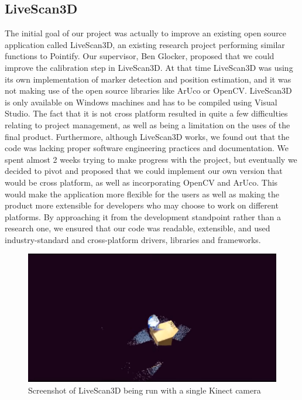 \documentclass{article}
\begin{document}
\subsection{LiveScan3D}
The initial goal of our project was actually to improve an existing open source application called LiveScan3D, an existing research project performing similar functions to Pointify. Our supervisor, Ben Glocker, proposed that we could improve the calibration step in LiveScan3D. At that time LiveScan3D was using its own implementation of marker detection and position estimation, and it was not making use of the open source libraries like ArUco or OpenCV. LiveScan3D is only available on Windows machines and has to be compiled using Visual Studio. The fact that it is not cross platform resulted in quite a few difficulties relating to project management, as well as being a limitation on the uses of the final product. Furthermore, although LiveScan3D works, we found out that the code was lacking proper software engineering practices and documentation. We spent almost 2 weeks trying to make progress with the project, but eventually we decided to pivot and proposed that we could implement our own version that would be cross platform, as well as incorporating OpenCV and ArUco. This would make the application more flexible for the users as well as making the product more extensible for developers who may choose to work on different platforms. By approaching it from the development standpoint rather than a research one, we ensured that our code was readable, extensible, and used industry-standard and cross-platform drivers, libraries and frameworks.
\begin{figure}[h]
  \centering
  \includegraphics[scale=0.3]{livescan}
  \caption{Screenshot of LiveScan3D being run with a single Kinect camera}
  \label{fig:livescan}
\end{figure}
\end{document}
